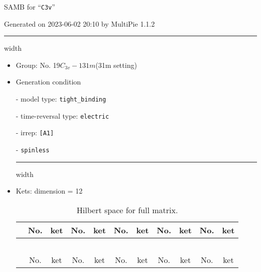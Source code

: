 \documentclass[fleqn,10pt,landscape]{article}
\begin{document}
\setcounter{MaxMatrixCols}{16}

\setlength{\baselineskip}{16pt}
\footnotesize
\begin{center}
\LARGE
SAMB for ``\texttt{C3v}''
\end{center}
\begin{flushright}
Generated on 2023-06-02 20:10 by MultiPie 1.1.2
\end{flushright}
\vspace{1cm}


 \hfil \hrule height 1mm width \textwidth \hfil

\begin{itemize}
\item Group: No. 19\quad$C_{3v}-1$\quad$31m$\quad(31m setting)\quad[ trigonal ]

\vspace{5mm}

\item Generation condition

\quad - model type: \texttt{tight_binding}

\quad - time-reversal type: \texttt{electric}

\quad - irrep: \texttt{[A1]}

\quad - \texttt{spinless}


 \hfil \hrule height 1mm width \textwidth \hfil

\item Kets: dimension = 12
\begin{center}
\renewcommand{\arraystretch}{1.3}
\begin{longtable}{c|cc|cc|cc|cc|cc}
\caption{Hilbert space for full matrix.}
 \\
 \hline \hline
 & No. & ket & No. & ket & No. & ket & No. & ket & No. & ket \\ \hline \endfirsthead

\multicolumn{10}{l}{\tablename\ \thetable{}} \\
 \hline \hline
 & No. & ket & No. & ket & No. & ket & No. & ket & No. & ket \\ \hline \endhead


\end{longtable}
\end{center}
\end{itemize}
\end{document}
